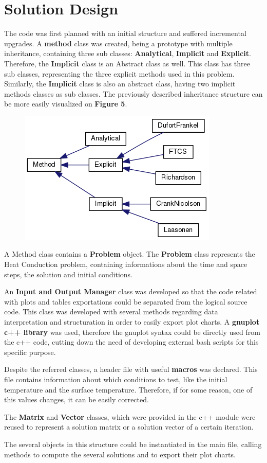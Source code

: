 \documentclass[12pt]{report}
\begin{document}
\section*{Solution Design}
\par The code was first planned with an initial structure and suffered incremental upgrades. A \textbf{method} class was created, being a prototype with multiple inheritance, containing three sub classes: \textbf{Analytical}, \textbf{Implicit} and \textbf{Explicit}. Therefore, the \textbf{Implicit} class is an Abstract class as well. This class has three sub classes, representing the three explicit methods used in this problem. Similarly, the \textbf{Implicit} class is also an abstract class, having two implicit methods classes as sub classes. The previously described inheritance structure can be more easily visualized on \textbf{Figure 5}.

\begin{figure}[!htb]
  \centering
  \includegraphics[width=.5\linewidth]{method_inheritance.png}
\end{figure}

\par A Method class contains a \textbf{Problem} object. The \textbf{Problem} class represents the Heat Conduction problem, containing informations about the time and space steps, the solution and initial conditions.
\par An \textbf{Input and Output Manager} class was developed so that the code related with plots and tables exportations could be separated from the logical source code. This class was developed with several methods regarding data interpretation and structuration in order to easily export plot charts. A \textbf{gnuplot c++ library} was used, therefore the gnuplot syntax could be directly used from the c++ code, cutting down the need of developing external bash scripts for this specific purpose.
\par Despite the referred classes, a header file with useful \textbf{macros} was declared. This file contains information about which conditions to test, like the initial temperature and the surface temperature. Therefore, if for some reason, one of this values changes, it can be easily corrected.
\par The \textbf{Matrix} and \textbf{Vector} classes, which were provided in the c++ module were reused to represent a solution matrix or a solution vector of a certain iteration.
\par The several objects in this structure could be instantiated in the main file, calling methods to compute the several solutions and to export their plot charts. 
\end{document}
